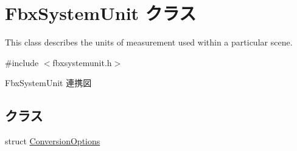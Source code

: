 \hypertarget{class_fbx_system_unit}{}\section{Fbx\+System\+Unit クラス}
\label{class_fbx_system_unit}


This class describes the units of measurement used within a particular scene.  




{\ttfamily \#include $<$fbxsystemunit.\+h$>$}



Fbx\+System\+Unit 連携図
\subsection*{クラス}
\begin{DoxyCompactItemize}
\item 
struct \hyperlink{struct_fbx_system_unit_1_1_conversion_options}{Conversion\+Options}
\end{DoxyCompactItemize}
